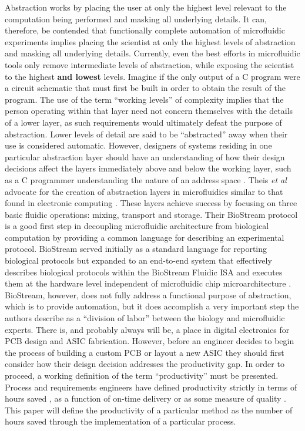 Abstraction works by placing the user at only the highest level relevant to the computation being performed and masking all underlying details. It can, therefore, be contended that functionally complete automation of microfluidic experiments implies placing the scientist at only the highest levels of abstraction and masking all underlying details. Currently, even the best efforts in microfluidic tools only remove intermediate levels of abstraction, while exposing the scientist to the highest \textbf{and lowest} levels. Imagine if the only output of a C program were a circuit schematic that must first be built in order to obtain the result of the program. The use of the term ``working levels'' of complexity implies that the person operating within that layer need not concern themselves with the details of a lower layer, as such requirements would ultimately defeat the purpose of abstraction. Lower levels of detail are said to be ``abstracted'' away when their use is considered automatic. However, designers of systems residing in one particular abstraction layer should have an understanding of how their design decisions affect the layers immediately above and below the working layer, such as a C programmer understanding the nature of an address space \cite{Harris+Harris}. Theis \emph{et al} advocate for the creation of abstraction layers in microfluidics similar to that found in electronic computing \cite{thies2008}. These layers achieve success by focusing on three basic fluidic operations: mixing, transport and storage. Their BioStream protocol is a good first step in decoupling microfluidic architecture from biological computation by providing a common language for describing an experimental protocol. BioStream served initially as a standard language for reporting biological protocols but expanded to an end-to-end system that effectively describes biological protocols within the BioStream Fluidic ISA and executes them at the hardware level independent of microfluidic chip microarchitecture \cite{thies2008}. BioStream, however, does not fully address a functional purpose of abstraction, which is to provide automation, but it does accomplish a very important step the authors describe as a ``division of labor'' between the biology and microfluidic experts. 
There is, and probably always will be, a place in digital electronics for PCB design and ASIC fabrication. However, before an engineer decides to begin the process of building a custom PCB or layout a new ASIC they should first consider how their deisgn decision addresses the productivity gap. In order to proceed, a working definition of the term ``productivity'' must be presented. Process and requirements engineers \cite{Review_ProcessEngr} have defined productivity strictly in terms of hours saved \cite{CostBenefit_hours}, as a function of on-time delivery \cite{OnTimeDelivery} or as some measure of quality \cite{Quality}. This paper will define the productivity of a particular method as the number of hours saved through the implementation of a particular process.

